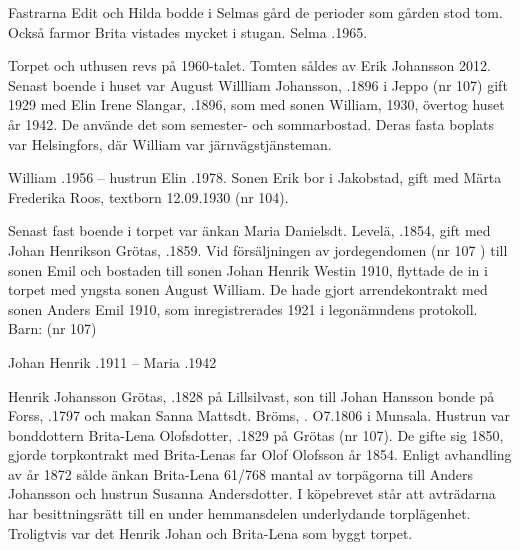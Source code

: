 Fastrarna Edit och Hilda bodde i Selmas gård de perioder som gården stod tom. Också farmor Brita vistades mycket i stugan. Selma .1965.




Torpet och uthusen revs på 1960-talet. Tomten såldes av Erik Johansson 2012. Senast boende i huset var August Willliam Johansson, .1896 i Jeppo (nr 107) gift 1929 med Elin Irene Slangar, .1896, som med sonen William,  1930, övertog huset år 1942. De använde det som semester- och sommarbostad. Deras fasta boplats var Helsingfors, där William var järnvägstjänsteman.

William .1956  --  hustrun Elin .1978.
Sonen Erik bor i Jakobstad, gift med Märta Frederika Roos, textborn 12.09.1930 (nr 104).


Senast fast boende i torpet var änkan Maria Danielsdt. Levelä, .1854, gift med Johan Henrikson Grötas, .1859. Vid försäljningen av jordegendomen (nr 107 ) till sonen Emil och bostaden till sonen Johan Henrik Westin 1910, flyttade de in i torpet med yngsta sonen August William. De hade gjort arrendekontrakt med sonen Anders Emil 1910, som inregistrerades 1921 i legonämndens protokoll.  Barn: (nr 107)

Johan Henrik .1911  --  Maria .1942


Henrik Johansson Grötas, .1828 på Lillsilvast, son till Johan Hansson bonde på Forss, .1797 och makan Sanna Mattsdt. Bröms, . O7.1806 i Munsala. Hustrun var bonddottern Brita-Lena Olofsdotter, .1829 på Grötas (nr 107). De gifte sig 1850, gjorde torpkontrakt med Brita-Lenas far Olof Olofsson år 1854. Enligt avhandling av år 1872 sålde änkan Brita-Lena 61/768 mantal av torpägorna till Anders Johansson och hustrun Susanna Andersdotter. I köpebrevet står att avträdarna har besittningsrätt till en under hemmansdelen underlydande torplägenhet. Troligtvis var det Henrik Johan och Brita-Lena som byggt torpet.

